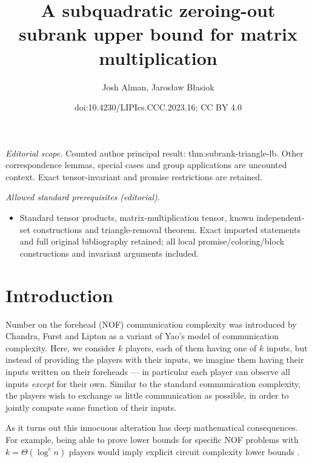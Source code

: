 \documentclass[10pt,a4paper]{article}
\title{A subquadratic zeroing-out subrank upper bound for matrix multiplication}
\author{Josh Alman, Jarosław Błasiok}
\date{doi:10.4230/LIPIcs.CCC.2023.16; CC BY 4.0}
\newcommand{\jnote}[1]{\todo[inline, color=blue!30!white]{#1 \\ -\textsc{Jarek}}}
\newcommand{\joshnote}[1]{\todo[inline, color=red!30!white]{#1 \\ -\textsc{Josh}}}
\begin{document}
\maketitle
\noindent\textit{Editorial scope.} Counted author principal result: thm:subrank-triangle-lb. Other correspondence lemmas, special cases and group applications are uncounted context. Exact tensor-invariant and promise restrictions are retained.\par\medskip
\noindent\textit{Allowed standard prerequisites (editorial).}\begin{itemize}
\item Standard tensor products, matrix-multiplication tensor, known independent-set constructions and triangle-removal theorem. Exact imported statements and full original bibliography retained; all local promise/coloring/block constructions and invariant arguments included.
\end{itemize}\medskip
\section{Introduction}


Number on the forehead (NOF) communication complexity was introduced by Chandra, Furst and Lipton \cite{CFL83} as a variant of Yao's model of communication complexity. Here, we consider $k$ players, each of them having one of $k$ inputs, but instead of providing the players with their inputs, we imagine them having their inputs written on their foreheads --- in particular each player can observe all inputs \emph{except} for their own. Similar to the standard communication complexity, the players wish to exchange as little communication as possible, in order to jointly compute some function of their inputs.

As it turns out this innocuous alteration has deep mathematical consequences. For example, being able to prove lower bounds for specific NOF problems with $k = \Theta(\log^c n)$ players would imply explicit circuit complexity lower bounds \cite{HG90,BT94}.
\end{document}
